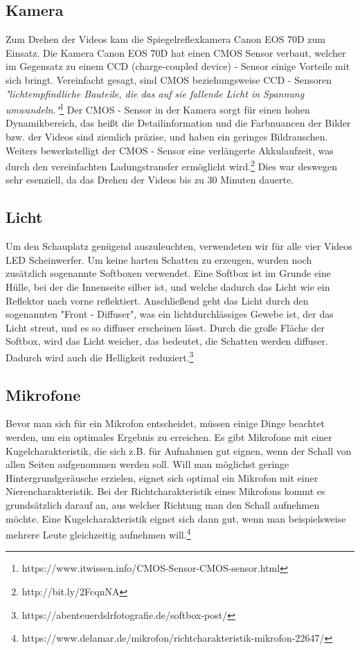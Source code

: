 \subsection{Kamera}
\renewcommand{\kapitelautor}{Autor: Kerstin Schön}
Zum Drehen der Videos kam die Spiegelreflexkamera Canon EOS 70D zum Einsatz. Die Kamera Canon EOS 70D hat einen CMOS Sensor verbaut, welcher im Gegensatz zu einem CCD (charge-coupled device) - Sensor einige Vorteile mit sich bringt. Vereinfacht gesagt, sind CMOS beziehungsweise CCD - Sensoren \textit{"lichtempfindliche Bauteile, die das auf sie fallende Licht in Spannung umwandeln."}\footnote{\label{foot:3}https://www.itwissen.info/CMOS-Sensor-CMOS-sensor.html}
Der CMOS - Sensor in der Kamera sorgt für einen hohen Dynamikbereich, das heißt die Detailinformation und die Farbnuancen der Bilder bzw. der Videos sind ziemlich präzise, und haben ein geringes Bildrauschen. Weiters bewerkstelligt der CMOS - Sensor eine verlängerte Akkulaufzeit, was durch den vereinfachten Ladungstransfer ermöglicht wird.\footnote{\label{foot:4}http://bit.ly/2FcqnNA} Dies war deswegen sehr esenziell, da das Drehen der Videos bis zu 30 Minuten dauerte.

\subsection{Licht}
\renewcommand{\kapitelautor}{Autor: Kerstin Schön}
Um den Schauplatz genügend auszuleuchten, verwendeten wir für alle vier Videos LED Scheinwerfer. Um keine harten Schatten zu erzeugen, wurden noch zusätzlich sogenannte Softboxen verwendet. Eine Softbox ist im Grunde eine Hülle, bei der die Innenseite silber ist, und welche dadurch das Licht wie ein Reflektor nach vorne reflektiert. Anschließend geht das Licht durch den sogenannten "Front - Diffuser", was ein lichtdurchlässiges Gewebe ist, der das Licht streut, und es so diffuser erscheinen lässt. Durch die große Fläche der Softbox, wird das Licht weicher, das bedeutet, die Schatten werden diffuser. Dadurch wird auch die Helligkeit reduziert.\footnote{\label{foot:4}https://abenteuerdslrfotografie.de/softbox-post/}

\subsection{Mikrofone}
\renewcommand{\kapitelautor}{Autor: Kerstin Schön}
Bevor man sich für ein Mikrofon entscheidet, müssen einige Dinge beachtet werden, um ein optimales Ergebnis zu erreichen. Es gibt Mikrofone mit einer Kugelcharakteristik, die sich z.B. für Aufnahmen gut eignen, wenn der Schall von allen Seiten aufgenommen werden soll. Will man möglichst geringe Hintergrundgeräusche erzielen, eignet sich optimal ein Mikrofon mit einer Nierencharakteristik. 
Bei der Richtcharakteristik eines Mikrofons kommt es grundsätzlich darauf an, aus welcher Richtung man den Schall aufnehmen möchte. Eine Kugelcharakteristik eignet sich dann gut, wenn man beispielsweise mehrere Leute gleichzeitig aufnehmen will.\footnote{\label{foot:5}https://www.delamar.de/mikrofon/richtcharakteristik-mikrofon-22647/}

